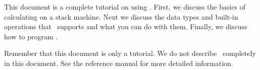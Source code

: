 This document is a complete tutorial on using \CLAC. First, we discuss the basics of calculating
on a stack machine. Next we discuss the data types and built-in operations that \CLAC\ supports
and what you can do with them. Finally, we discuss how to program \CLAC.

Remember that this document is only a tutorial. We do not describe \CLAC\ completely in this
document. See the reference manual for more detailed information.
